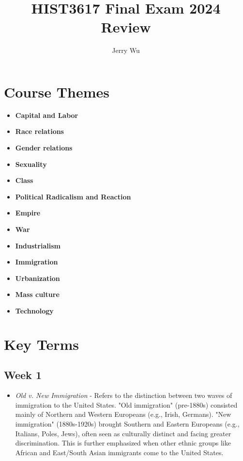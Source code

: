 \documentclass[12pt]{article}
\title{HIST3617 Final Exam 2024 Review}
\author{Jerry Wu}
\begin{document}
\maketitle

\section*{Course Themes}
\begin{itemize}
    \item{\textbf{Capital and Labor}}
    \item{\textbf{Race relations}}
    \item{\textbf{Gender relations}}
    \item{\textbf{Sexuality}}
    \item{\textbf{Class}}
    \item{\textbf{Political Radicalism and Reaction}}
    \item{\textbf{Empire}}
    \item{\textbf{War}}
    \item{\textbf{Industrialism}}
    \item{\textbf{Immigration}}
    \item{\textbf{Urbanization}}
    \item{\textbf{Mass culture}}
    \item{\textbf{Technology}}
\end{itemize}

\section*{Key Terms}

\subsection*{Week 1}

\begin{itemize}
    \item \textit{Old v. New Immigration} - Refers to the distinction between two waves of immigration to the United States. "Old immigration" (pre-1880s) consisted mainly of Northern and Western Europeans (e.g., Irish, Germans). "New immigration" (1880s-1920s) brought Southern and Eastern Europeans (e.g., Italians, Poles, Jews), often seen as culturally distinct and facing greater discrimination. This is further emphasized when other ethnic groups like African and East/South Asian immigrants come to the United States.
\end{itemize}
\end{document}
